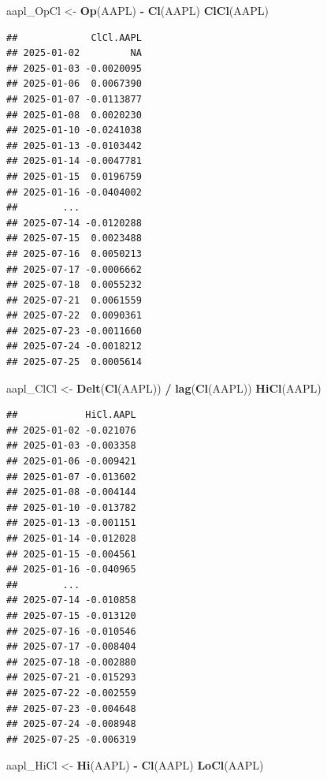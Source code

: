 \documentclass[]{ctexbook}
\newenvironment{Shaded}{\begin{snugshade}}{\end{snugshade}}
\newcommand{\FunctionTok}[1]{\textcolor[rgb]{0.13,0.29,0.53}{\textbf{#1}}}
\newcommand{\NormalTok}[1]{#1}
\newcommand{\OtherTok}[1]{\textcolor[rgb]{0.56,0.35,0.01}{#1}}
\newcommand{\SpecialCharTok}[1]{\textcolor[rgb]{0.81,0.36,0.00}{\textbf{#1}}}
\begin{document}
\begin{Shaded}
\begin{Highlighting}[]
\NormalTok{aapl\_OpCl }\OtherTok{\textless{}{-}} \FunctionTok{Op}\NormalTok{(AAPL) }\SpecialCharTok{{-}} \FunctionTok{Cl}\NormalTok{(AAPL)}
\FunctionTok{ClCl}\NormalTok{(AAPL)}
\end{Highlighting}
\end{Shaded}

\begin{verbatim}
##             ClCl.AAPL
## 2025-01-02         NA
## 2025-01-03 -0.0020095
## 2025-01-06  0.0067390
## 2025-01-07 -0.0113877
## 2025-01-08  0.0020230
## 2025-01-10 -0.0241038
## 2025-01-13 -0.0103442
## 2025-01-14 -0.0047781
## 2025-01-15  0.0196759
## 2025-01-16 -0.0404002
##        ...           
## 2025-07-14 -0.0120288
## 2025-07-15  0.0023488
## 2025-07-16  0.0050213
## 2025-07-17 -0.0006662
## 2025-07-18  0.0055232
## 2025-07-21  0.0061559
## 2025-07-22  0.0090361
## 2025-07-23 -0.0011660
## 2025-07-24 -0.0018212
## 2025-07-25  0.0005614
\end{verbatim}

\begin{Shaded}
\begin{Highlighting}[]
\NormalTok{aapl\_ClCl }\OtherTok{\textless{}{-}} \FunctionTok{Delt}\NormalTok{(}\FunctionTok{Cl}\NormalTok{(AAPL)) }\SpecialCharTok{/} \FunctionTok{lag}\NormalTok{(}\FunctionTok{Cl}\NormalTok{(AAPL))}
\FunctionTok{HiCl}\NormalTok{(AAPL)}
\end{Highlighting}
\end{Shaded}

\begin{verbatim}
##            HiCl.AAPL
## 2025-01-02 -0.021076
## 2025-01-03 -0.003358
## 2025-01-06 -0.009421
## 2025-01-07 -0.013602
## 2025-01-08 -0.004144
## 2025-01-10 -0.013782
## 2025-01-13 -0.001151
## 2025-01-14 -0.012028
## 2025-01-15 -0.004561
## 2025-01-16 -0.040965
##        ...          
## 2025-07-14 -0.010858
## 2025-07-15 -0.013120
## 2025-07-16 -0.010546
## 2025-07-17 -0.008404
## 2025-07-18 -0.002880
## 2025-07-21 -0.015293
## 2025-07-22 -0.002559
## 2025-07-23 -0.004648
## 2025-07-24 -0.008948
## 2025-07-25 -0.006319
\end{verbatim}

\begin{Shaded}
\begin{Highlighting}[]
\NormalTok{aapl\_HiCl }\OtherTok{\textless{}{-}} \FunctionTok{Hi}\NormalTok{(AAPL) }\SpecialCharTok{{-}} \FunctionTok{Cl}\NormalTok{(AAPL)}
\FunctionTok{LoCl}\NormalTok{(AAPL)}
\end{Highlighting}
\end{Shaded}
\end{document}
